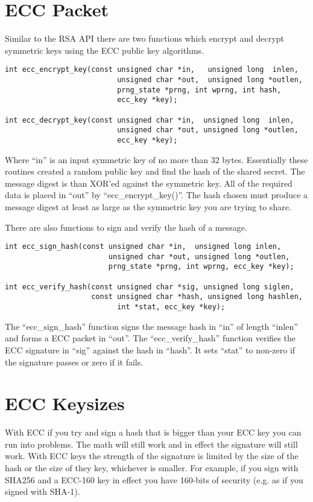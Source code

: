 \documentclass[a4paper]{book}
\begin{document}
\section{ECC Packet}
Similar to the RSA API there are two functions which encrypt and decrypt symmetric keys using the ECC public key
algorithms.

 
\begin{verbatim}
int ecc_encrypt_key(const unsigned char *in,   unsigned long  inlen,
                          unsigned char *out,  unsigned long *outlen, 
                          prng_state *prng, int wprng, int hash, 
                          ecc_key *key);

int ecc_decrypt_key(const unsigned char *in,  unsigned long  inlen,
                          unsigned char *out, unsigned long *outlen, 
                          ecc_key *key);
\end{verbatim}

Where ``in'' is an input symmetric key of no more than 32 bytes.  Essentially these routines created a random public key
and find the hash of the shared secret.  The message digest is than XOR'ed against the symmetric key.  All of the required
data is placed in ``out'' by ``ecc\_encrypt\_key()''.   The hash chosen must produce a message digest at least as large
as the symmetric key you are trying to share.

There are also functions to sign and verify the hash of a message.
 
\begin{verbatim}
int ecc_sign_hash(const unsigned char *in,  unsigned long inlen,
                        unsigned char *out, unsigned long *outlen,
                        prng_state *prng, int wprng, ecc_key *key);

int ecc_verify_hash(const unsigned char *sig, unsigned long siglen,
                    const unsigned char *hash, unsigned long hashlen, 
                          int *stat, ecc_key *key);
\end{verbatim}

The ``ecc\_sign\_hash'' function signs the message hash in ``in'' of length ``inlen'' and forms a ECC packet in ``out''.  
The ``ecc\_verify\_hash'' function verifies the ECC signature in ``sig'' against the hash in ``hash''.  It sets ``stat''
to non-zero if the signature passes or zero if it fails.


\section{ECC Keysizes}
With ECC if you try and sign a hash that is bigger than your ECC key you can run into problems.  The math will still work
and in effect the signature will still work.  With ECC keys the strength of the signature is limited by the size of
the hash or the size of they key, whichever is smaller.  For example, if you sign with SHA256 and a ECC-160 key in effect
you have 160-bits of security (e.g. as if you signed with SHA-1).  
\end{document}
